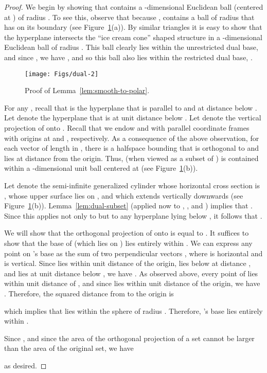 \documentclass[11pt]{article}   \usepackage[letterpaper,hmargin=2.1cm,vmargin=3cm]{geometry}
\begin{document}
{\SmoothToPolarStmt*}
\begin{proof}
We begin by showing that  contains a -dimensional Euclidean ball (centered at ) of radius . To see this, observe that because ,  contains a ball  of radius  that has  on its boundary (see Figure~\ref{fig:dual-2}(a)). By similar triangles it is easy to show that the hyperplane  intersects the ``ice cream cone'' shaped structure  in a -dimensional Euclidean ball of radius .  This ball clearly lies within the unrestricted dual base, and since , we have , and so this ball also lies within the restricted dual base, .

\begin{figure}[htbp]
  \centerline{\texttt{[image: Figs/dual-2]}}
  \caption{Proof of Lemma~\ref{lem:smooth-to-polar}.}
  \label{fig:dual-2}
\end{figure}


For any , recall that  is the hyperplane that is parallel to  and at distance  below . Let  denote the hyperplane that is at unit distance below . Let  denote the vertical projection of  onto . Recall that we endow  and  with parallel coordinate frames with origins at  and , respectively. As a consequence of the above observation, for each vector  of length  in , there is a halfspace bounding  that is orthogonal to  and lies at distance  from the origin. Thus,  (when viewed as a subset of ) is contained within a -dimensional unit ball centered at  (see Figure~\ref{fig:dual-2}(b)).

Let  denote the semi-infinite generalized cylinder whose horizontal cross section is , whose upper surface lies on , and which extends vertically downwards  (see Figure~\ref{fig:dual-2}(b)). Lemma~\ref{lem:dual-subset} (applied now to , ,  and ) implies that . Since this applies not only to  but to any hyperplane lying below , it follows that .

We will show that the orthogonal projection of  onto  is equal to . It suffices to show that the base of  (which lies on ) lies entirely within . We can express any point  on 's base as the sum of two perpendicular vectors , where  is horizontal and  is vertical. Since  lies within unit distance of the origin,  lies below  at distance , and  lies at unit distance below , we have . As observed above, every point of  lies within unit distance of , and since  lies within unit distance of the origin, we have . Therefore, the squared distance from  to the origin is

which implies that  lies within the sphere  of radius . Therefore, 's base lies entirely within .

Since , and since the area of the orthogonal projection of a set cannot be larger than the area of the original set, we have

as desired.
\end{proof}
\end{document}
